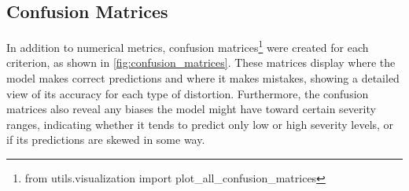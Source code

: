 \subsection{Confusion Matrices}
\label{subsec:ConfusionMatrices}
In addition to numerical metrics, confusion matrices\footnote{from utils.visualization import plot\_all\_confusion\_matrices} were created for each criterion, as shown in \autoref{fig:confusion_matrices}. These matrices display where the model makes correct predictions and where it makes mistakes, showing a detailed view of its accuracy for each type of distortion. Furthermore, the confusion matrices also reveal any biases the model might have toward certain severity ranges, indicating whether it tends to predict only low or high severity levels, or if its predictions are skewed in some way. \par
\vspace{\baselineskip}
